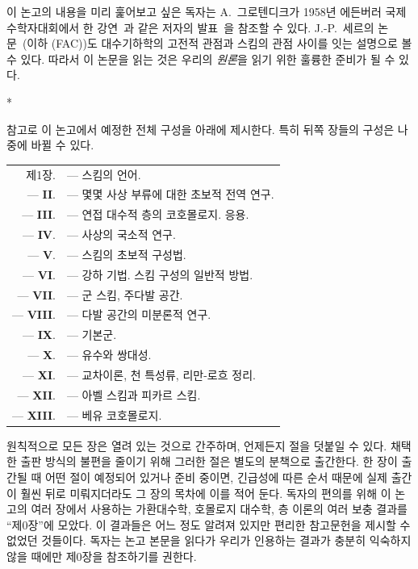 이 논고의 내용을 미리 훑어보고 싶은 독자는 A.~그로텐디크가 1958년 에든버러 국제수학자대회에서 한 강연~\cite{I-7}과 같은 저자의 발표~\cite{I-8}을 참조할 수 있다.
J.-P.~세르의 논문~\cite{I-14}(이하 (FAC))도 대수기하학의 고전적 관점과 스킴의 관점 사이를 잇는 설명으로 볼 수 있다. 따라서 이 논문을 읽는 것은 우리의 \emph{원론}을 읽기 위한 훌륭한 준비가 될 수 있다.

\bigskip
\begin{center}*\quad*\quad*\end{center}
\bigskip

참고로 이 논고에서 예정한 전체 구성을 아래에 제시한다. 특히 뒤쪽 장들의 구성은 나중에 바뀔 수 있다.

\medskip
\begin{tabular}{rl}
  제1장. & --- 스킴의 언어.\\
  --- \textbf{II}. & --- 몇몇 사상 부류에 대한 초보적 전역 연구.\\
  --- \textbf{III}. & --- 연접 대수적 층의 코호몰로지. 응용.\\
  --- \textbf{IV}. & --- 사상의 국소적 연구.\\
  --- \textbf{V}. & --- 스킴의 초보적 구성법.\\
  --- \textbf{VI}. & --- 강하 기법. 스킴 구성의 일반적 방법.\\
  --- \textbf{VII}. & --- 군 스킴, 주다발 공간.\\
  --- \textbf{VIII}. & --- 다발 공간의 미분론적 연구.\\
  --- \textbf{IX}. & --- 기본군.\\
  --- \textbf{X}. & --- 유수와 쌍대성.\\
  --- \textbf{XI}. & --- 교차이론, 천 특성류, 리만-로흐 정리.\\
  --- \textbf{XII}. & --- 아벨 스킴과 피카르 스킴.\\
  --- \textbf{XIII}. & --- 베유 코호몰로지.\\
\end{tabular}
\medskip

원칙적으로 모든 장은 열려 있는 것으로 간주하며, 언제든지 절을 덧붙일 수 있다. 채택한 출판 방식의 불편을 줄이기 위해 그러한 절은 별도의 분책으로 출간한다.
한 장이 출간될 때 어떤 절이 예정되어 있거나 준비 중이면, 긴급성에 따른 순서 때문에 실제 출간이 훨씬 뒤로 미뤄지더라도 그 장의 목차에 이를 적어 둔다.
독자의 편의를 위해 이 논고의 여러 장에서 사용하는 가환대수학, 호몰로지 대수학, 층 이론의 여러 보충 결과를 ``제0장''에 모았다. 이 결과들은 어느 정도 알려져 있지만 편리한 참고문헌을 제시할 수 없었던 것들이다.
독자는 논고 본문을 읽다가 우리가 인용하는 결과가 충분히 익숙하지 않을 때에만 제0장을 참조하기를 권한다.

